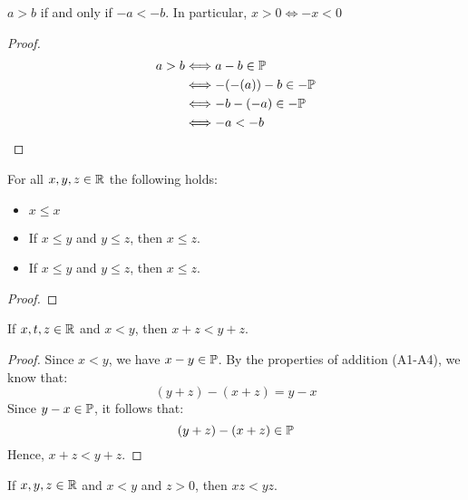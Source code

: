 \documentclass[11pt]{article}
\begin{document}
\begin{proposition}
    \(a > b\) if and only if \(-a < -b\). In particular, \(x > 0 \Longleftrightarrow -x < 0\)
\end{proposition}
\begin{proof}
    \begin{align*}
        a > b & \Longleftrightarrow  a - b \in \mathbb P        \\
              & \Longleftrightarrow  -(-(a)) - b \in -\mathbb P \\
              & \Longleftrightarrow  -b -(-a) \in -\mathbb P    \\
              & \Longleftrightarrow  -a < -b
    \end{align*}
\end{proof}
\begin{proposition}
    For all \(x, y, z \in \mathbb R\) the following holds:
    \begin{itemize}
        \item \(x \leq x\)
        \item If \(x \leq y\) and \(y \leq z\), then \(x \leq z\).
        \item If \(x \leq y\) and \(y \leq z\), then \(x \leq z\).
    \end{itemize}
\end{proposition}
\begin{proof}

\end{proof}

\begin{proposition}
    If \(x, t, z \in \mathbb R\) and \(x < y\), then \(x + z < y + z\).
\end{proposition}
\begin{proof}
    Since \(x < y\), we have \(x - y \in \mathbb P\).
    By the properties of addition (A1-A4), we know that:
    \[
        (y + z) - (x + z) = y - x
    \]
    Since \(y - x \in \mathbb P\), it follows that:
    \[
        (y + z) - (x + z) \in \mathbb P
    \]
    Hence, \(x + z < y + z\).
\end{proof}

\begin{proposition}
    If \(x, y, z \in \mathbb R\) and \(x < y\) and \(z > 0\), then \(xz < yz\).
\end{proposition}
\end{document}
